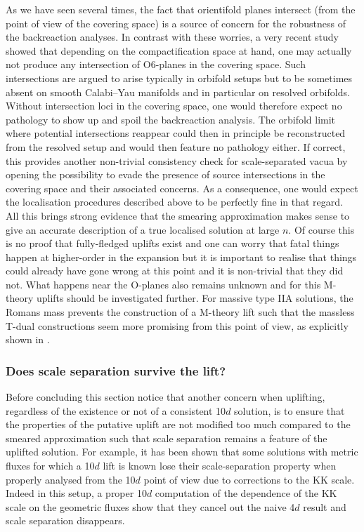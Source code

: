 \documentclass[11pt, a4paper]{article}
\begin{document}
As we have seen several times, the fact that orientifold planes intersect (from the point of view of the covering space) is a source of concern for the robustness of the backreaction analyses. In contrast with these worries, a very recent study \cite{Junghans:2023yue} showed that depending on the compactification space at hand, one may actually not produce any intersection of O6-planes in the covering space. Such intersections are argued to arise typically in orbifold setups but to be sometimes absent on smooth Calabi--Yau manifolds and in particular on resolved orbifolds. Without intersection loci in the covering space, one would therefore expect no pathology to show up and spoil the backreaction analysis. The orbifold limit where potential intersections reappear could then in principle be reconstructed from the resolved setup and would then feature no pathology either. If correct, this provides another non-trivial consistency check for scale-separated vacua by opening the possibility to evade the presence of source intersections in the covering space and their associated concerns. As a consequence, one would expect the localisation procedures described above to be perfectly fine in that regard.\\

All this brings strong evidence that the smearing approximation makes sense to give an accurate description of a true localised solution at large $n$. Of course this is no proof that fully-fledged uplifts exist and one can worry that fatal things happen at higher-order in the expansion but it is important to realise that things could already have gone wrong at this point and it is non-trivial that they did not. What happens near the O-planes also remains unknown and for this M-theory uplifts should be investigated further. For massive type IIA solutions, the Romans mass prevents the construction of a M-theory lift \cite{Aharony:2010af} such that the massless T-dual constructions \cite{Cribiori:2021djm,Carrasco:2023hta} seem more promising from this point of view, as explicitly shown in \cite{Cribiori:2021djm}.

\subsubsection{Does scale separation survive the lift?}

Before concluding this section notice that another concern when uplifting, regardless of the existence or not of a consistent 10$d$ solution, is to ensure that the properties of the putative uplift are not modified too much compared to the smeared approximation such that scale separation remains a feature of the uplifted solution. For example, it has been shown that some solutions with metric fluxes for which a 10$d$ lift is known \cite{Aldazabal:2007sn} lose their scale-separation property when properly analysed from the 10$d$ point of view \cite{Font:2019uva} due to corrections to the KK scale. Indeed in this setup, a proper 10$d$ computation of the dependence of the KK scale on the geometric fluxes show that they cancel out the naive 4$d$ result and scale separation disappears.
\end{document}
